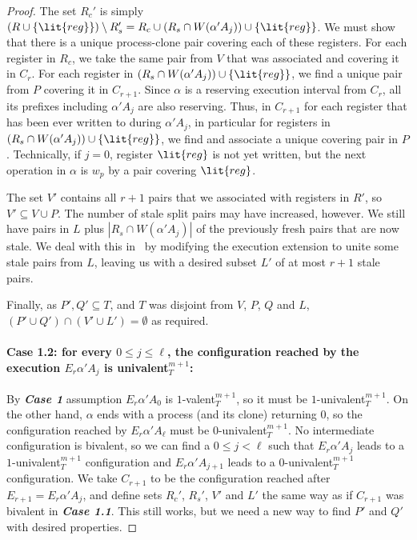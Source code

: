 \begin{proof}
The set $R_c'$ is simply $(R \cup \{\lit{reg}\}) \setminus R_s' = R_c \cup (R_s \cap W(\alpha' A_j)) \cup \{\lit{reg}\}$. 	
We must show that there is a unique process-clone pair covering each of these registers.
For each register in $R_c$, we take the same pair from $V$ that was associated and covering it in $C_r$.
For each register in $(R_s \cap W(\alpha' A_j)) \cup \{\lit{reg}\}$, 
  we find a unique pair from $P$ covering it in $C_{r+1}$.
Since $\alpha$ is a reserving execution interval from $C_r$, 
  all its prefixes including $\alpha' A_j$ are also reserving.
Thus, in $C_{r+1}$ for each register that has been ever written to during $\alpha' A_j$, 
  in particular for registers in $(R_s \cap W(\alpha' A_j)) \cup \{\lit{reg}\}$, 
  we find and associate a unique covering pair in $P$.
Technically, if $j=0$, register $\lit{reg}$ is not yet written, 
  but the next operation in $\alpha$ is $w_p$ by a pair covering $\lit{reg}$.

The set $V'$ contains all $r+1$ pairs that we associated with registers in $R'$, so $V' \subseteq V \cup P$.
The number of stale split pairs may have increased, however.
We still have pairs in $L$ plus $|R_s \cap W(\alpha' A_j)|$ of the previously fresh pairs that are now stale.
We deal with this in~ by modifying the execution extension to unite some stale pairs from $L$, 
  leaving us with a desired subset $L'$ of at most $r+1$ stale pairs.

Finally, as $P', Q' \subseteq T$, and $T$ was disjoint from $V$, $P$, $Q$ and $L$,
  $(P' \cup Q') \cap (V' \cup L') = \emptyset$ as required.

\paragraph{Case 1.2: for every $0 \leq j \leq \ell$, 
  the configuration reached by the execution $E_r \alpha' A_j$ is univalent$_T^{m+1}$:}
By \emph{\textbf{Case 1}} assumption $E_r \alpha' A_0$ is $1$-valent$_T^{m+1}$, 
  so it must be $1$-univalent$_T^{m+1}$.
On the other hand, $\alpha$ ends with a process (and its clone) returning $0$, 
  so the configuration reached by $E_r \alpha' A_{\ell}$ must be $0$-univalent$_T^{m+1}$.
No intermediate configuration is bivalent, so we can find a $0 \leq j < \ell$ such that 
  $E_r \alpha' A_j$ leads to a $1$-univalent$_T^{m+1}$ configuration and 
  $E_r \alpha' A_{j+1}$ leads to a $0$-univalent$_T^{m+1}$ configuration. 
We take $C_{r+1}$ to be the configuration reached after $E_{r+1} = E_r \alpha' A_j$,
  and define sets $R_c'$, $R_s'$, $V'$ and $L'$ the same way as if $C_{r+1}$ was bivalent in \emph{\textbf{Case 1.1}}.
This still works, but we need a new way to find $P'$ and $Q'$ with desired properties.


\end{proof}
